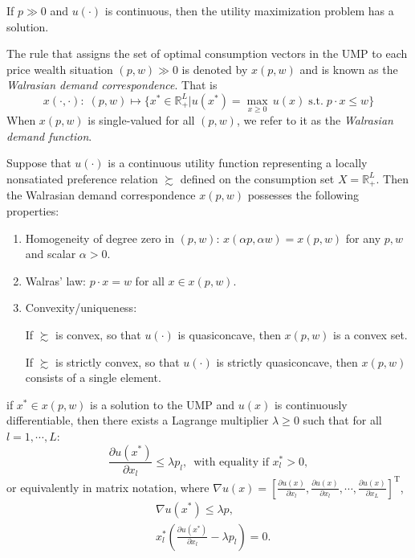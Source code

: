 \documentclass[11pt,fleqn]{book} %
\begin{document}
\begin{proposition}
	If $p\gg 0$ and $u(\cdot)$ is continuous, then the utility maximization problem has a solution.
\end{proposition}

\begin{definition}
	The rule that assigns the set of optimal consumption vectors in the UMP to each price wealth situation $(p, w)\gg 0$ is denoted by $x(p, w)$ and is known as the
	\emph{Walrasian demand correspondence}. That is
	\[
	x(\cdot,\cdot):\;(p,w)\mapsto \{x^*\in\mathbb{R}_+^L|u(x^*)=\max_{x\ge 0}\, u(x)\;\mathrm{s.t.}\; p\cdot x\le w\}
	\]	
	\noindent When $x(p, w)$ is single-valued for all $(p, w)$, we refer to it as the \emph{Walrasian demand function}.
	
\end{definition}


\begin{proposition}
	 Suppose that $u(\cdot)$ is a continuous utility function representing a locally nonsatiated preference relation $\succsim$ defined on the consumption set $X=\mathbb{R}_+^L$. Then the Walrasian demand correspondence $x(p, w)$ possesses the following
	 properties:
	 \begin{enumerate}
	 	\item Homogeneity of degree zero in $( p , w )$: $x(\alpha p, \alpha w) = x(p, w)$ for any $p, w$	and scalar $\alpha > 0$.
	 	\item Walras' law: $p\cdot x = w$ for all $x\in x(p,w)$.
	 	\item Convexity/uniqueness:
	 	
	 	 If $\succsim$ is convex, so that $u(\cdot)$ is quasiconcave, then $x(p, w)$ is a convex set. 
	 	 
	 	 If $\succsim$ is strictly convex, so that $u(\cdot)$ is strictly quasiconcave, then $x(p, w)$ consists of a single element.
	 \end{enumerate}
\end{proposition}

\begin{theorem}
	if $x^* \in x(p,w)$ is a solution to the UMP and $u(x)$ is continuously differentiable, then there exists a
	Lagrange multiplier $\lambda\ge0$ such that for all $l = 1,\cdots, L$:
	\[
	\frac{\partial u(x^*)}{\partial x_l}\le \lambda p_l,\ \;\text{with equality if } x^*_l > 0,
	\]
	or equivalently in matrix notation, where $\nabla u(x)= \left[\frac{\partial u(x)}{\partial x_l},\frac{\partial u(x)}{\partial x_l},\cdots,\frac{\partial u(x)}{\partial x_L} \right]^\mathrm{T}$,
	\begin{align*}
	&\nabla u(x^*)\le \lambda p, \\
    &x^*_l\left(\frac{\partial u(x^*)}{\partial x_l}-\lambda p_l\right)= 0.
	\end{align*}
\end{theorem}
\end{document}
